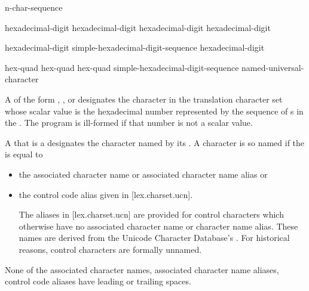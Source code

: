 \documentclass{wg21}
\newcommand{\replaceucs}{\changed{UCS}{Unicode}}
\begin{document}
\begin{bnf}
    \br
     n-char-sequence \terminal{\}}
\end{bnf}

\begin{bnf}
    \br
    hexadecimal-digit hexadecimal-digit hexadecimal-digit hexadecimal-digit
\end{bnf}

\begin{bnf}
    \br
    hexadecimal-digit\br
    simple-hexadecimal-digit-sequence hexadecimal-digit
\end{bnf}

\begin{bnf}
    \br
     hex-quad\br
     hex-quad hex-quad\br
     simple-hexadecimal-digit-sequence \terminal{\}}\br
    named-universal-character
\end{bnf}

\pnum
A 
of the form  ,
  , or
designates the character in the translation character set
whose \replaceucs{} scalar value is the hexadecimal number represented by
the sequence of s
in the .
The program is ill-formed if that number is not a \replaceucs{} scalar value.

\pnum
\begin{removedblock}
A 
that is a 
designates the character named by its .
A character is so named if the  is equal to
\begin{itemize}
    \item
    the associated character name or associated character name alias
    or
    \item
    the control code alias given in [lex.charset.ucn].
    \begin{note}
        The aliases in [lex.charset.ucn] are provided for control characters
        which otherwise have no associated character name or character name alias.
        These names are derived from
        the Unicode Character Database's .
        For historical reasons, control characters are formally unnamed.
    \end{note}
\end{itemize}
\begin{note}
    None of the associated character names,
    associated character name aliases,
    control code aliases have leading or trailing spaces.
\end{note}
\end{removedblock}
\end{document}
